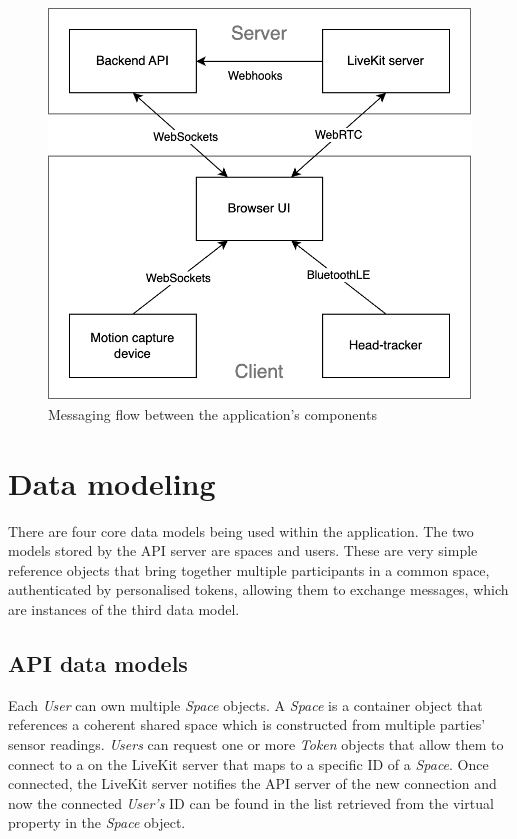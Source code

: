 \begin{figure}[h]
\centering
\includegraphics[scale=0.4]{04_Artefakte/01_Abbildungen/application-messaging-flow}
\caption[Application messaging flow]{Messaging flow between the application's components\protect}
\label{fig:messagingFlow}
\end{figure}

\section{Data modeling}
\label{sec:datamodeling}

There are four core data models being used within the application.
The two models stored by the \ac{API} server are spaces and users.
These are very simple reference objects that bring together multiple participants in a common space, authenticated by personalised tokens, allowing them to exchange messages, which are instances of the third data model.

\subsection{API data models}

Each \emph{User} can own multiple \emph{Space} objects.
A \emph{Space} is a container object that references a coherent shared space which is constructed from multiple parties' sensor readings. \emph{Users} can request one or more \emph{Token} objects that allow them to connect to a  on the LiveKit server that maps to a specific ID of a \emph{Space}.
Once connected, the LiveKit server notifies the \ac{API} server of the new connection and now the connected \emph{User's} ID can be found in the list retrieved from the virtual  property in the \emph{Space} object.

